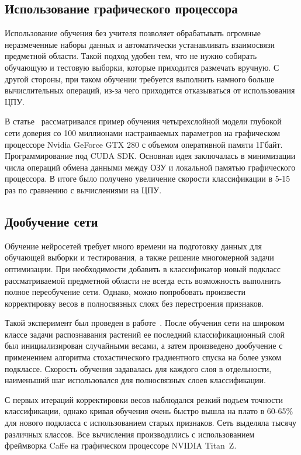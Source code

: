 \documentclass[a4paper,14pt]{extarticle} %
\begin{document}
\subsection{Использование графического процессора}
\hspace{\parindent} Использование обучения без учителя позволяет обрабатывать огромные неразмеченные наборы данных и автоматически устанавливать взаимосвязи предметной области. Такой подход удобен тем, что не нужно собирать обучающую и тестовую выборки, которые приходится размечать вручную. С другой стороны, при таком обучении требуется выполнить намного больше вычислительных операций, из-за чего приходится отказываться от использования ЦПУ. 

В статье~\cite{raina2009large} рассматривался пример обучения четырехслойной модели глубокой сети доверия со 100 миллионами настраиваемых параметров на графическом процессоре Nvidia GeForce GTX 280 с объемом оперативной памяти 1Гбайт. Программирование под CUDA SDK. Основная идея заключалась в минимизации числа операций обмена данными между ОЗУ и локальной памятью графического процессора. В итоге было получено увеличение скорости классификации в 5-15 раз по сравнению с вычислениями на ЦПУ.

\subsection{Дообучение сети}
\hspace{\parindent} Обучение нейросетей требует много времени на подготовку данных для обучающей выборки и тестирования, а также решение многомерной задачи оптимизации. При необходимости добавить в классификатор новый подкласс рассматриваемой предметной области не всегда есть возможность выполнить полное переобучение сети. Однако, можно попробовать произвести корректировку весов в полносвязных слоях без перестроения признаков.

Такой эксперимент был проведен в работе~\cite{reyes2015fine}. После обучения сети на широком классе задачи распознавания растений ее последний классификационный слой был инициализирован случайными весами, а затем произведено дообучение с применением алгоритма стохастического градиентного спуска на более узком подклассе. Скорость обучения задавалась для каждого слоя в отдельности, наименьший шаг использовался для полносвязных слоев классификации. 

С первых итераций корректировки весов наблюдался резкий подъем точности классификации, однако кривая обучения очень быстро вышла на плато в 60-65\% для нового подкласса с использованием старых признаков. Сеть выделяла тысячу различных классов. Все вычисления производились с использованием фреймворка Caffe на графическом процессоре NVIDIA Titan~Z.
\end{document}
